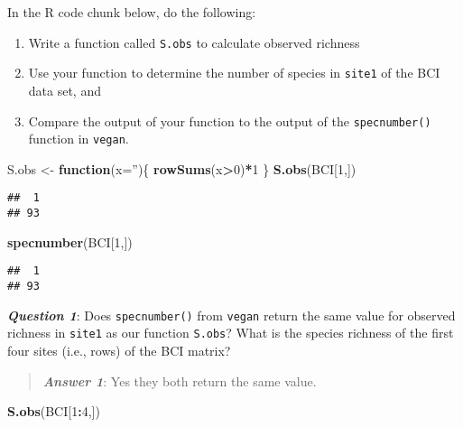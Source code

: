 \documentclass[
]{article}
\newenvironment{Shaded}{\begin{snugshade}}{\end{snugshade}}
\newcommand{\ControlFlowTok}[1]{\textcolor[rgb]{0.13,0.29,0.53}{\textbf{#1}}}
\newcommand{\DataTypeTok}[1]{\textcolor[rgb]{0.13,0.29,0.53}{#1}}
\newcommand{\DecValTok}[1]{\textcolor[rgb]{0.00,0.00,0.81}{#1}}
\newcommand{\KeywordTok}[1]{\textcolor[rgb]{0.13,0.29,0.53}{\textbf{#1}}}
\newcommand{\NormalTok}[1]{#1}
\newcommand{\OperatorTok}[1]{\textcolor[rgb]{0.81,0.36,0.00}{\textbf{#1}}}
\newcommand{\StringTok}[1]{\textcolor[rgb]{0.31,0.60,0.02}{#1}}
\begin{document}
In the R code chunk below, do the following:

\begin{enumerate}
\def\labelenumi{\arabic{enumi}.}
\item
  Write a function called \texttt{S.obs} to calculate observed richness
\item
  Use your function to determine the number of species in \texttt{site1}
  of the BCI data set, and
\item
  Compare the output of your function to the output of the
  \texttt{specnumber()} function in \texttt{vegan}.
\end{enumerate}

\begin{Shaded}
\begin{Highlighting}[]
\NormalTok{S.obs <-}\StringTok{ }\ControlFlowTok{function}\NormalTok{(}\DataTypeTok{x=}\StringTok{''}\NormalTok{)\{}
  \KeywordTok{rowSums}\NormalTok{(x}\OperatorTok{>}\DecValTok{0}\NormalTok{)}\OperatorTok{*}\DecValTok{1}
\NormalTok{  \}}
\KeywordTok{S.obs}\NormalTok{(BCI[}\DecValTok{1}\NormalTok{,])}
\end{Highlighting}
\end{Shaded}

\begin{verbatim}
##  1 
## 93
\end{verbatim}

\begin{Shaded}
\begin{Highlighting}[]
\KeywordTok{specnumber}\NormalTok{(BCI[}\DecValTok{1}\NormalTok{,])}
\end{Highlighting}
\end{Shaded}

\begin{verbatim}
##  1 
## 93
\end{verbatim}

\textbf{\emph{Question 1}}: Does \texttt{specnumber()} from
\texttt{vegan} return the same value for observed richness in
\texttt{site1} as our function \texttt{S.obs}? What is the species
richness of the first four sites (i.e., rows) of the BCI matrix?

\begin{quote}
\textbf{\emph{Answer 1}}: Yes they both return the same value.
\end{quote}

\begin{Shaded}
\begin{Highlighting}[]
\KeywordTok{S.obs}\NormalTok{(BCI[}\DecValTok{1}\OperatorTok{:}\DecValTok{4}\NormalTok{,])}
\end{Highlighting}
\end{Shaded}
\end{document}
